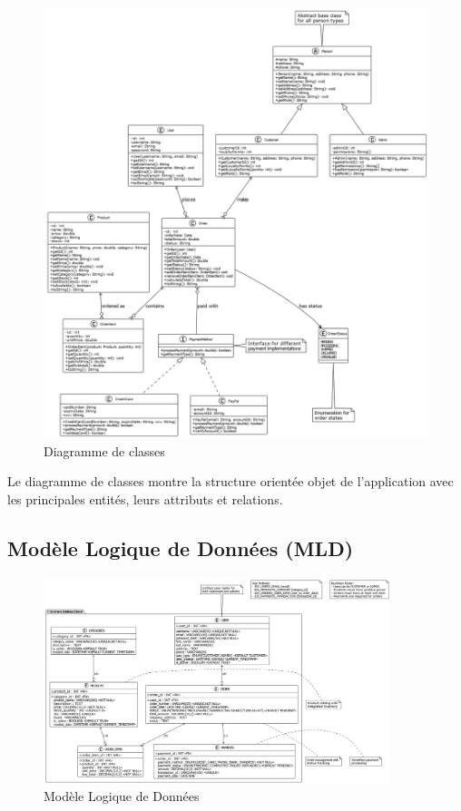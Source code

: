 \documentclass{rapportENSIAS}
\begin{document}
\begin{figure}[H]
    \centering
    \includegraphics[width=\textwidth]{class diagram.png}
    \caption{Diagramme de classes}
    \label{fig:classdiagram}
\end{figure}

Le diagramme de classes montre la structure orient\'{e}e objet de l'application avec les principales entit\'{e}s, leurs attributs et relations.

\subsection{Mod\`{e}le Logique de Donn\'{e}es (MLD)}

\begin{figure}[H]
    \centering
    \includegraphics[width=0.9\textwidth]{MLD.png}
    \caption{Mod\`{e}le Logique de Donn\'{e}es}
    \label{fig:mld}
\end{figure}
\end{document}
